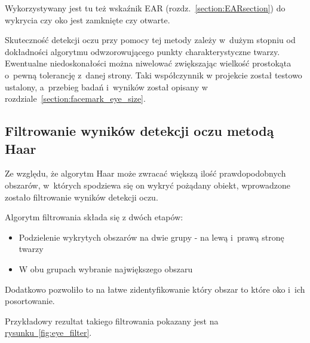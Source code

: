 Wykorzystywany jest tu też wskaźnik EAR (rozdz.~\hyperref[{section:EARsection}]{\ref{section:EARsection}}) do wykrycia czy oko jest zamknięte czy otwarte.

\par

Skuteczność detekcji oczu przy pomocy tej metody zależy w~dużym stopniu od dokładności algorytmu odwzorowującego punkty charakterystyczne twarzy. Ewentualne niedoskonałości można niwelować zwiększając wielkość prostokąta o~pewną tolerancję z~danej strony. Taki współczynnik w projekcie został testowo ustalony, a~przebieg badań i~wyników został opisany w rozdziale~\hyperref[{section:facemark_eye_size}]{\ref{section:facemark_eye_size}}.



\subsection{Filtrowanie wyników detekcji oczu metodą Haar}

Ze względu, że algorytm Haar może zwracać większą ilość prawdopodobnych obszarów, w~których spodziewa się on wykryć pożądany obiekt, wprowadzone zostało filtrowanie wyników detekcji oczu. 

\par

Algorytm filtrowania składa się z dwóch etapów:

\begin{itemize}
    \item Podzielenie wykrytych obszarów na dwie grupy - na lewą i~prawą stronę twarzy
    \item W obu grupach wybranie największego obszaru
\end{itemize}


Dodatkowo pozwoliło to na łatwe zidentyfikowanie który obszar to które oko i~ich posortowanie.

\par

Przykładowy rezultat takiego filtrowania pokazany jest na \hyperref[{fig:eye_filter}]{rysunku~\ref{fig:eye_filter}}. 


